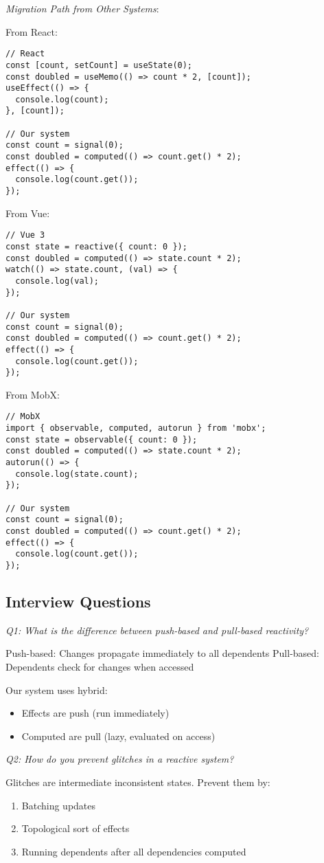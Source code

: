 \documentclass[11pt]{article}
\begin{document}
\emph{Migration Path from Other Systems}:

From React:
\begin{verbatim}
// React
const [count, setCount] = useState(0);
const doubled = useMemo(() => count * 2, [count]);
useEffect(() => {
  console.log(count);
}, [count]);

// Our system
const count = signal(0);
const doubled = computed(() => count.get() * 2);
effect(() => {
  console.log(count.get());
});
\end{verbatim}

From Vue:
\begin{verbatim}
// Vue 3
const state = reactive({ count: 0 });
const doubled = computed(() => state.count * 2);
watch(() => state.count, (val) => {
  console.log(val);
});

// Our system
const count = signal(0);
const doubled = computed(() => count.get() * 2);
effect(() => {
  console.log(count.get());
});
\end{verbatim}

From MobX:
\begin{verbatim}
// MobX
import { observable, computed, autorun } from 'mobx';
const state = observable({ count: 0 });
const doubled = computed(() => state.count * 2);
autorun(() => {
  console.log(state.count);
});

// Our system
const count = signal(0);
const doubled = computed(() => count.get() * 2);
effect(() => {
  console.log(count.get());
});
\end{verbatim}
\subsection{Interview Questions}
\label{sec:org160f0a2}

\emph{Q1: What is the difference between push-based and pull-based reactivity?}

Push-based: Changes propagate immediately to all dependents
Pull-based: Dependents check for changes when accessed

Our system uses hybrid:
\begin{itemize}
\item Effects are push (run immediately)
\item Computed are pull (lazy, evaluated on access)
\end{itemize}

\emph{Q2: How do you prevent glitches in a reactive system?}

Glitches are intermediate inconsistent states. Prevent them by:
\begin{enumerate}
\item Batching updates
\item Topological sort of effects
\item Running dependents after all dependencies computed
\end{enumerate}
\end{document}
